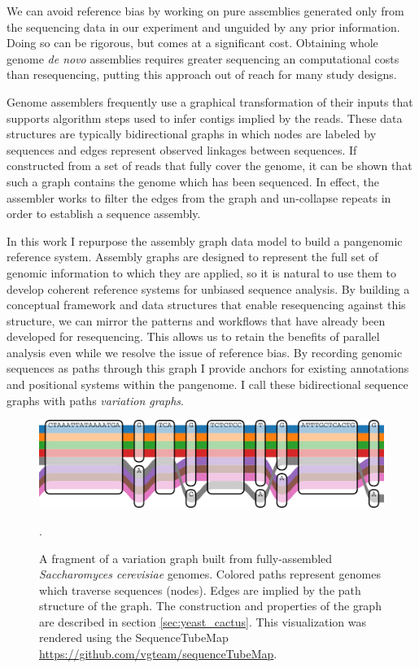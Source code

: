 We can avoid reference bias by working on pure assemblies generated only from the sequencing data in our experiment and unguided by any prior information.
Doing so can be rigorous, but comes at a significant cost.
Obtaining whole genome \emph{de novo} assemblies requires greater sequencing an computational costs than resequencing, putting this approach out of reach for many study designs.

Genome assemblers frequently use a graphical transformation of their inputs that supports algorithm steps used to infer contigs implied by the reads.
These data structures are typically bidirectional graphs in which nodes are labeled by sequences and edges represent observed linkages between sequences.
If constructed from a set of reads that fully cover the genome, it can be shown that such a graph contains the genome which has been sequenced.
In effect, the assembler works to filter the edges from the graph and un-collapse repeats in order to establish a sequence assembly.

In this work I repurpose the assembly graph data model to build a pangenomic reference system.
Assembly graphs are designed to represent the full set of genomic information to which they are applied, so it is natural to use them to develop coherent reference systems for unbiased sequence analysis.
By building a conceptual framework and data structures that enable resequencing against this structure, we can mirror the patterns and workflows that have already been developed for resequencing.
This allows us to retain the benefits of parallel analysis even while we resolve the issue of reference bias.
By recording genomic sequences as paths through this graph I provide anchors for existing annotations and positional systems within the pangenome.
I call these bidirectional sequence graphs with paths \emph{variation graphs}.


\begin{figure}[htbp!]
  \centering
  \includegraphics[width=1.0\textwidth]{Chapter1/Figs/vg_tubemap.pdf}
  \caption[A variation graph]{
    A fragment of a variation graph built from fully-assembled \emph{Saccharomyces cerevisiae} genomes.
    Colored paths represent genomes which traverse sequences (nodes).
    Edges are implied by the path structure of the graph.
    The construction and properties of the graph are described in section \ref{sec:yeast_cactus}.
    This visualization was rendered using the SequenceTubeMap \url{https://github.com/vgteam/sequenceTubeMap}.
    } 
\label{fig:variation_graph_tubemap}.
\end{figure}


